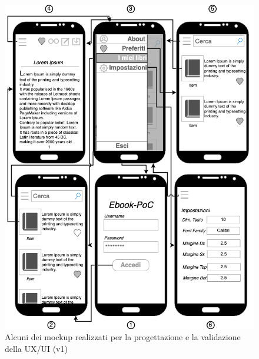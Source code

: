 \begin{figure}[H]
\centering
\includegraphics[width=1\textwidth]{img/tesi-14-mockup1.drawio.png}
\caption{Alcuni dei mockup realizzati per la progettazione e la validazione della UX/UI (v1)}
\end{figure}

